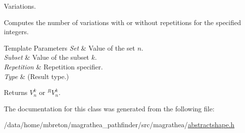 Variations. 

Computes the number of variations with or without repetitions for the specified integers. 
\begin{DoxyTemplParams}{Template Parameters}
{\em Set} & Value of the set $n$. \\
\hline
{\em Subset} & Value of the subset $k$. \\
\hline
{\em Repetition} & Repetition specifier. \\
\hline
{\em Type} & (Result type.) \\
\hline
\end{DoxyTemplParams}
\begin{DoxyReturn}{Returns}
$V^{k}_{n}$ or ${}^{R}V^{k}_{n}$. 
\end{DoxyReturn}


The documentation for this class was generated from the following file\-:\begin{DoxyCompactItemize}
\item 
/data/home/mbreton/magrathea\-\_\-pathfinder/src/magrathea/\hyperlink{abstractshape_8h}{abstractshape.\-h}\end{DoxyCompactItemize}
